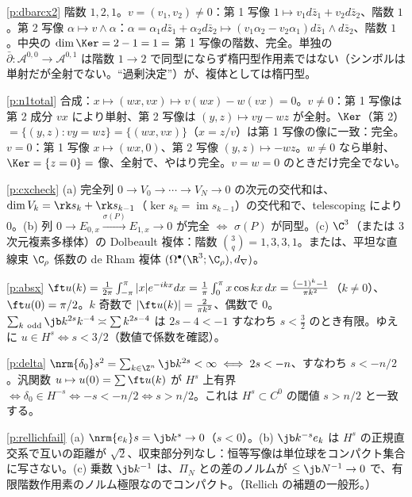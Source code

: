 \begin{sol}{\ref{p:dbarcx2}}
階数 $1,2,1$。$v=(v_1,v_2)\neq0$：第 1 写像 $1\mapsto v_1d\bar z_1+v_2d\bar z_2$、階数 $1$。第 2 写像 $\alpha\mapsto v\wedge\alpha$：$\alpha=\alpha_1d\bar z_1+\alpha_2d\bar z_2\mapsto(v_1\alpha_2-v_2\alpha_1)d\bar z_1\wedge d\bar z_2$、階数 $1$。中央の $\dim\Ker=2-1=1=$ 第 1 写像の階数、完全。単独の $\bar\partial:\mathcal A^{0,0}\to\mathcal A^{0,1}$ は階数 $1\to2$ で同型にならず楕円型作用素ではない（シンボルは単射だが全射でない。``過剰決定''）が、複体としては楕円型。
\end{sol}
\begin{sol}{\ref{p:n1total}}
合成：$x\mapsto(wx,vx)\mapsto v(wx)-w(vx)=0$。$v\ne0$：第 1 写像は第 2 成分 $vx$ により単射、第 2 写像は $(y,z)\mapsto vy-wz$ が全射。$\Ker$（第 2）$=\{(y,z):vy=wz\}=\{(wx,vx)\}$（$x=z/v$）は第 1 写像の像に一致：完全。$v=0$：第 1 写像 $x\mapsto(wx,0)$、第 2 写像 $(y,z)\mapsto-wz$。$w\ne0$ なら単射、$\Ker=\{z=0\}=$ 像、全射で、やはり完全。$v=w=0$ のときだけ完全でない。
\end{sol}
\begin{sol}{\ref{p:cxcheck}}
(a) 完全列 $0\to V_0\to\cdots\to V_N\to0$ の次元の交代和は、$\dim V_k=\rk s_k+\rk s_{k-1}$（$\ker s_k=\operatorname{im}s_{k-1}$）の交代和で、telescoping により $0$。(b) 列 $0\to E_{0,x}\xrightarrow{\sigma(P)}E_{1,x}\to0$ が完全 $\iff$ $\sigma(P)$ が同型。(c) $\C^3$（または 3 次元複素多様体）の Dolbeault 複体：階数 $\binom3q=1,3,3,1$。または、平坦な直線束 $\C_\rho$ 係数の de Rham 複体 $(\Omega^\bullet(\R^3;\C_\rho),d_\nabla)$。
\end{sol}
\begin{sol}{\ref{p:absx}}
$\ft u(k)=\frac1{2\pi}\int_{-\pi}^\pi|x|e^{-ikx}dx=\frac1\pi\int_0^\pi x\cos kx\,dx=\frac{(-1)^k-1}{\pi k^2}$（$k\ne0$）、$\ft u(0)=\pi/2$。$k$ 奇数で $|\ft u(k)|=\frac2{\pi k^2}$、偶数で $0$。$\sum_{k\ \rm odd}\jb k^{2s}k^{-4}\asymp\sum k^{2s-4}$ は $2s-4<-1$ すなわち $s<\frac32$ のとき有限。ゆえに $u\in H^s\iff s<3/2$（数値で係数を確認）。
\end{sol}
\begin{sol}{\ref{p:delta}}
$\nrm{\delta_0}s^2=\sum_{k\in\Z^n}\jb k^{2s}<\infty\iff2s<-n$、すなわち $s<-n/2$。汎関数 $u\mapsto u(0)=\sum\ft u(k)$ が $H^s$ 上有界 $\iff\delta_0\in H^{-s}\iff-s<-n/2\iff s>n/2$。これは $H^s\subset C^0$ の閾値 $s>n/2$ と一致する。
\end{sol}
\begin{sol}{\ref{p:rellichfail}}
(a) $\nrm{e_k}s=\jb k^s\to0$（$s<0$）。(b) $\jb k^{-s}e_k$ は $H^s$ の正規直交系で互いの距離が $\sqrt2$、収束部分列なし：恒等写像は単位球をコンパクト集合に写さない。(c) 乗数 $\jb k^{-1}$ は、$\Pi_N$ との差のノルムが $\le\jb N^{-1}\to0$ で、有限階数作用素のノルム極限なのでコンパクト。（Rellich の補題の一般形。）
\end{sol}

